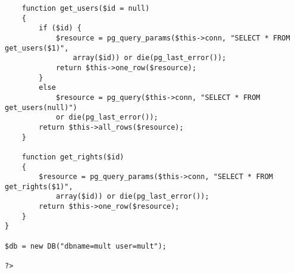 \documentclass[a4paper]{article}
\begin{document}
\begin{verbatim}
    function get_users($id = null)
    {
        if ($id) {
            $resource = pg_query_params($this->conn, "SELECT * FROM get_users($1)",
                array($id)) or die(pg_last_error());
            return $this->one_row($resource);
        }
        else
            $resource = pg_query($this->conn, "SELECT * FROM get_users(null)")
            or die(pg_last_error());
        return $this->all_rows($resource);
    }

    function get_rights($id)
    {
        $resource = pg_query_params($this->conn, "SELECT * FROM get_rights($1)",
            array($id)) or die(pg_last_error());
        return $this->one_row($resource);
    }
}

$db = new DB("dbname=mult user=mult");

?>
\end{verbatim}
\end{document}
